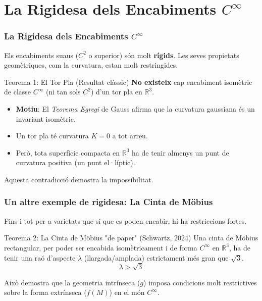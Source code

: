 \documentclass{beamer}
\begin{document}
\section{La Rigidesa dels Encabiments $C^\infty$}

\begin{frame}
  \frametitle{La Rigidesa dels Encabiments $C^\infty$}
  
  Els encabiments suaus ($C^2$ o superior) són molt \textbf{rígids}. Les seves propietats geomètriques, com la curvatura, estan molt restringides. 
  
  \begin{block}{Teorema 1: El Tor Pla (Resultat clàssic)}
    \textbf{No existeix} cap encabiment isomètric de classe $C^\infty$ (ni tan sols $C^2$) d'un tor pla en $\mathbb{R}^3$. 
  \end{block}
  
  \begin{itemize}
    \item \textbf{Motiu}: El \textit{Teorema Egregi} de Gauss afirma que la curvatura gaussiana és un invariant isomètric. 
    \item Un tor pla té curvatura $K=0$ a tot arreu. 
    \item Però, tota superfície compacta en $\mathbb{R}^3$ ha de tenir almenys un punt de curvatura positiva (un punt el·líptic). 
  \end{itemize}
  
  Aquesta contradicció demostra la impossibilitat. 
\end{frame}

\begin{frame}
  \frametitle{Un altre exemple de rigidesa: La Cinta de Möbius}
  
  Fins i tot per a varietats que sí que es poden encabir, hi ha restriccions fortes.
  
  \begin{block}{Teorema 2: La Cinta de Möbius "de paper" (Schwartz, 2024)}
    Una cinta de Möbius rectangular, per poder ser encabida isomètricament i de forma $C^\infty$ en $\mathbb{R}^3$, ha de tenir una raó d'aspecte $\lambda$ (llargada/amplada) estrictament més gran que $\sqrt{3}$. 
    $$ \lambda > \sqrt{3} $$
  \end{block}
  
  \begin{center}
  \end{center}
  
  Això demostra que la geometria intrínseca ($g$) imposa condicions molt restrictives sobre la forma extrínseca ($f(M)$) en el món $C^\infty$. 
  
\end{frame}
\end{document}
